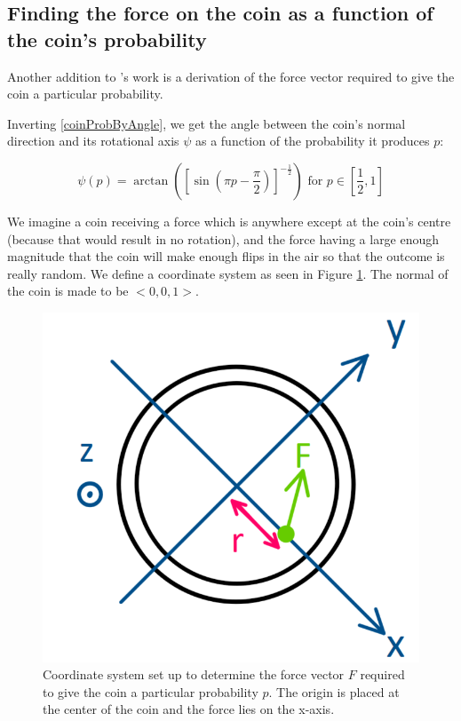 \documentclass[english,12pt,a4paper,final]{article}
\begin{document}
\subsection{Finding the force on the coin as a function of the coin's probability}

Another addition to \textcite{unfairCoin}'s work is a derivation of the force vector required to give the coin a particular probability.

Inverting \eqref{coinProbByAngle}, we get the angle between the coin's normal direction and its rotational axis $\psi$ as a function of the probability it produces $p$:

\begin{equation}\label{coinAngleByProb}
	\psi(p) = \arctan\left(\left[\sin(\pi p-\frac{\pi}{2})\right]^{-\frac{1}{2}}\right) \text{ for } p \in \left[\frac{1}{2}, 1\right]
\end{equation}

We imagine a coin receiving a force which is anywhere except at the coin's centre (because that would result in no rotation), and the force having a large enough magnitude that the coin will make enough flips in the air so that the outcome is really random. We define a coordinate system as seen in Figure \ref{fig:coincoords}. The normal of the coin is made to be $<0, 0, 1>$.

\begin{figure}[H]
	\centering
	\includegraphics[width=0.7\linewidth]{coinCoords}
	\caption{Coordinate system set up to determine the force vector $F$ required to give the coin a particular probability $p$. The origin is placed at the center of the coin and the force lies on the x-axis.}
	\label{fig:coincoords}
\end{figure}
\end{document}
